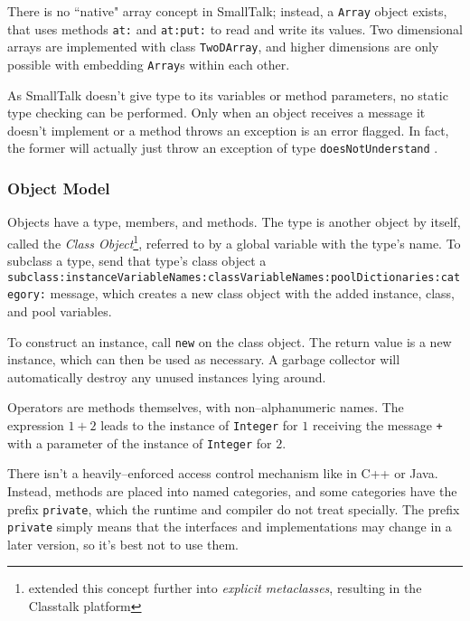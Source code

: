 	There is no ``native" array concept in SmallTalk\cite{567553}; instead, a \texttt{Array} object exists, that uses methods \texttt{at:} and \texttt{at:put:} to read and write its values.  Two dimensional arrays are implemented with class \texttt{TwoDArray}, and higher dimensions are only possible with embedding \texttt{Array}s within each other.

	As SmallTalk doesn't give type to its variables or method parameters, no static type checking can be performed.  Only when an object receives a message it doesn't implement or a method throws an exception is an error flagged.  In fact, the former will actually just throw an exception of type \texttt{doesNotUnderstand} .

	

\subsubsection{Object Model}

	Objects have a type, members, and methods.  The type is another object by itself, called the \emph{Class Object}\footnote{\cite{74921} extended this concept further into \emph{explicit metaclasses}\cite{74911}, resulting in the Classtalk platform}, referred to by a global variable with the type's name.  To subclass a type, send that type's class object a \texttt{subclass:\-instance\-Variable\-Names:\-class\-Variable\-Names:\-pool\-Dictionaries:\-category:} message, which creates a new class object with the added instance, class, and pool variables.

	To construct an instance, call \texttt{new} on the class object.  The return value is a new instance, which can then be used as necessary.  A garbage collector will automatically destroy any unused instances lying around.

	Operators are methods themselves, with non--alphanumeric names.  The expression $1 + 2$ leads to the instance of \texttt{Integer} for $1$ receiving the message \texttt{+} with a parameter of the instance of \texttt{Integer} for $2$.

	There isn't a heavily--enforced access control mechanism like in C++ or Java.  Instead, methods are placed into named categories, and some categories have the prefix \texttt{private}, which the runtime and compiler do not treat specially.  The prefix \texttt{private} simply means that the interfaces and implementations may change in a later version, so it's best not to use them.

